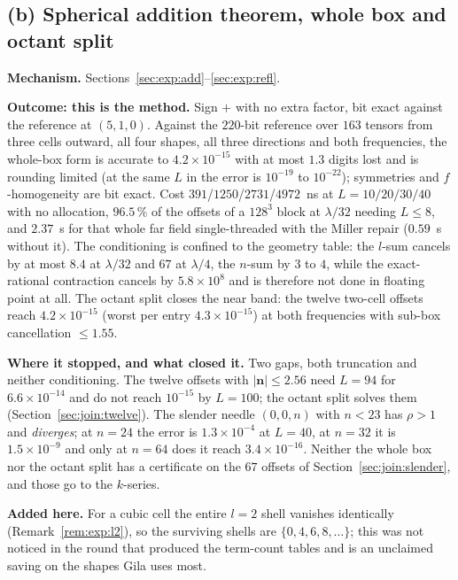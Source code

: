 \subsection{(b) Spherical addition theorem, whole box and octant split}
\label{sec:reg:b}

\textbf{Mechanism.} Sections~\ref{sec:exp:add}--\ref{sec:exp:refl}.

\textbf{Outcome: this is the method.} Sign $+$ with no extra factor, bit exact against the
reference at $(5,1,0)$. Against the $220$-bit reference over $163$ tensors from three
cells outward, all four shapes, all three directions and both frequencies, the whole-box
form is accurate to $4.2\times10^{-15}$ with at most $1.3$ digits lost and is rounding
limited (at the same $L$ in  the error is $10^{-19}$ to $10^{-22}$);
symmetries and $f$-homogeneity are bit exact. Cost $391$/$1250$/$2731$/$4972$~ns at
$L = 10/20/30/40$ with no allocation, $96.5\,\%$ of the offsets of a $128^3$ block at
$\lambda/32$ needing $L \le 8$, and $2.37$~s for that whole far field single-threaded
with the Miller repair ($0.59$~s without it). The conditioning is confined to the
geometry table: the $l$-sum cancels by at most $8.4$ at $\lambda/32$ and $67$ at
$\lambda/4$, the $n$-sum by $3$ to $4$, while the exact-rational contraction cancels by
$5.8\times10^{8}$ and is therefore not done in floating point at all. The octant split
closes the near band: the twelve two-cell offsets reach $4.2\times10^{-15}$ (worst per
entry $4.3\times10^{-15}$) at both frequencies with sub-box cancellation $\le 1.55$.

\textbf{Where it stopped, and what closed it.} Two gaps, both truncation and neither
conditioning. The twelve offsets with $|\mathbf{n}| \le 2.56$ need $L = 94$ for
$6.6\times10^{-14}$ and do not reach $10^{-15}$ by $L = 100$; the octant split solves
them (Section~\ref{sec:join:twelve}). The slender needle $(0,0,n)$ with $n < 23$ has
$\rho > 1$ and \emph{diverges}; at $n = 24$ the error is $1.3\times10^{-4}$ at
$L = 40$, at $n = 32$ it is $1.5\times10^{-9}$ and only at $n = 64$ does it reach
$3.4\times10^{-16}$. Neither the whole box nor the octant split has a certificate on the
$67$ offsets of Section~\ref{sec:join:slender}, and those go to the $k$-series.

\textbf{Added here.} For a cubic cell the entire $l = 2$ shell vanishes identically
(Remark~\ref{rem:exp:l2}), so the surviving shells are $\{0,4,6,8,\dots\}$; this was not
noticed in the round that produced the term-count tables and is an unclaimed saving on
the shapes Gila uses most.


